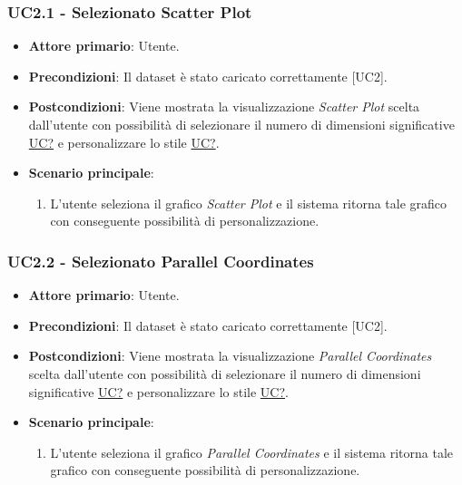 \subsubsection{UC2.1 - Selezionato Scatter Plot}
\label{sec:UC2.1}
\begin{itemize}
    \item \textbf{Attore primario}: Utente.
    \item \textbf{Precondizioni}: Il dataset è stato caricato correttamente [UC2].
    \item \textbf{Postcondizioni}: Viene mostrata la visualizzazione \textit{Scatter Plot} scelta dall'utente con possibilità di selezionare il numero di dimensioni significative \hyperref[sec:UC2]{UC?} e personalizzare lo stile \hyperref[sec:UC2]{UC?}. %
    \item \textbf{Scenario principale}:
          \begin{enumerate}
              \item L'utente seleziona il grafico \textit{Scatter Plot} e il sistema ritorna tale grafico con conseguente possibilità di personalizzazione. 
          \end{enumerate}
\end{itemize}

\subsubsection{UC2.2 - Selezionato Parallel Coordinates}
\label{sec:UC2.2}
\begin{itemize}
    \item \textbf{Attore primario}: Utente.
    \item \textbf{Precondizioni}: Il dataset è stato caricato correttamente [UC2].
    \item \textbf{Postcondizioni}: Viene mostrata la visualizzazione \textit{Parallel Coordinates} scelta dall'utente con possibilità di selezionare il numero di dimensioni significative \hyperref[sec:UC2]{UC?} e personalizzare lo stile \hyperref[sec:UC2]{UC?}. %
    \item \textbf{Scenario principale}:
          \begin{enumerate}
              \item L'utente seleziona il grafico \textit{Parallel Coordinates} e il sistema ritorna tale grafico con conseguente possibilità di personalizzazione. 
          \end{enumerate}
\end{itemize}

